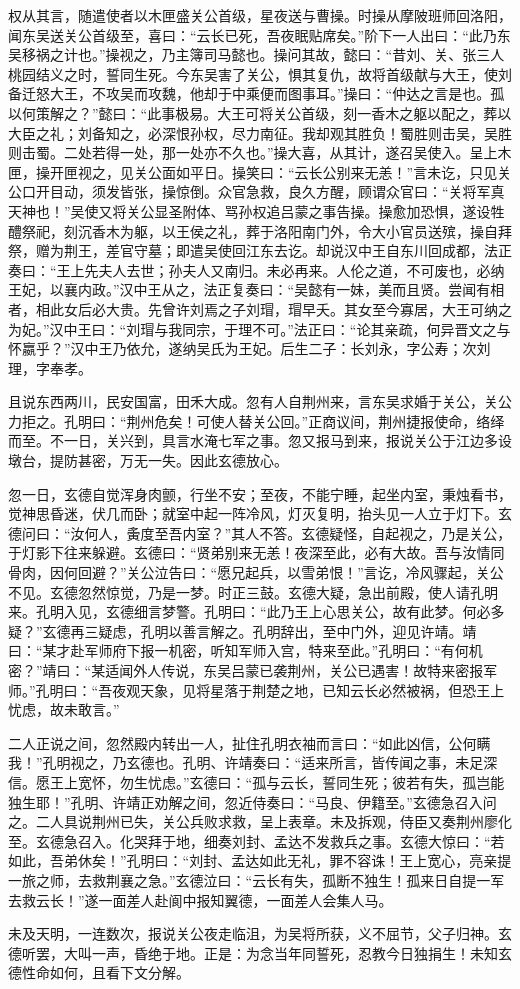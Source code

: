 权从其言，随遣使者以木匣盛关公首级，星夜送与曹操。时操从摩陂班师回洛阳，闻东吴送关公首级至，喜曰：“云长已死，吾夜眠贴席矣。”阶下一人出曰：“此乃东吴移祸之计也。”操视之，乃主簿司马懿也。操问其故，懿曰：“昔刘、关、张三人桃园结义之时，誓同生死。今东吴害了关公，惧其复仇，故将首级献与大王，使刘备迁怒大王，不攻吴而攻魏，他却于中乘便而图事耳。”操曰：“仲达之言是也。孤以何策解之？”懿曰：“此事极易。大王可将关公首级，刻一香木之躯以配之，葬以大臣之礼；刘备知之，必深恨孙权，尽力南征。我却观其胜负！蜀胜则击吴，吴胜则击蜀。二处若得一处，那一处亦不久也。”操大喜，从其计，遂召吴使入。呈上木匣，操开匣视之，见关公面如平日。操笑曰：“云长公别来无恙！”言未讫，只见关公口开目动，须发皆张，操惊倒。众官急救，良久方醒，顾谓众官曰：“关将军真天神也！”吴使又将关公显圣附体、骂孙权追吕蒙之事告操。操愈加恐惧，遂设牲醴祭祀，刻沉香木为躯，以王侯之礼，葬于洛阳南门外，令大小官员送殡，操自拜祭，赠为荆王，差官守墓；即遣吴使回江东去讫。却说汉中王自东川回成都，法正奏曰：“王上先夫人去世；孙夫人又南归。未必再来。人伦之道，不可废也，必纳王妃，以襄内政。”汉中王从之，法正复奏曰：“吴懿有一妹，美而且贤。尝闻有相者，相此女后必大贵。先曾许刘焉之子刘瑁，瑁早夭。其女至今寡居，大王可纳之为妃。”汉中王曰：“刘瑁与我同宗，于理不可。”法正曰：“论其亲疏，何异晋文之与怀嬴乎？”汉中王乃依允，遂纳吴氏为王妃。后生二子：长刘永，字公寿；次刘理，字奉孝。

且说东西两川，民安国富，田禾大成。忽有人自荆州来，言东吴求婚于关公，关公力拒之。孔明曰：“荆州危矣！可使人替关公回。”正商议间，荆州捷报使命，络绎而至。不一日，关兴到，具言水淹七军之事。忽又报马到来，报说关公于江边多设墩台，提防甚密，万无一失。因此玄德放心。

忽一日，玄德自觉浑身肉颤，行坐不安；至夜，不能宁睡，起坐内室，秉烛看书，觉神思昏迷，伏几而卧；就室中起一阵冷风，灯灭复明，抬头见一人立于灯下。玄德问曰：“汝何人，夤度至吾内室？”其人不答。玄德疑怪，自起视之，乃是关公，于灯影下往来躲避。玄德曰：“贤弟别来无恙！夜深至此，必有大故。吾与汝情同骨肉，因何回避？”关公泣告曰：“愿兄起兵，以雪弟恨！”言讫，冷风骤起，关公不见。玄德忽然惊觉，乃是一梦。时正三鼓。玄德大疑，急出前殿，使人请孔明来。孔明入见，玄德细言梦警。孔明曰：“此乃王上心思关公，故有此梦。何必多疑？”玄德再三疑虑，孔明以善言解之。孔明辞出，至中门外，迎见许靖。靖曰：“某才赴军师府下报一机密，听知军师入宫，特来至此。”孔明曰：“有何机密？”靖曰：“某适闻外人传说，东吴吕蒙已袭荆州，关公已遇害！故特来密报军师。”孔明曰：“吾夜观天象，见将星落于荆楚之地，已知云长必然被祸，但恐王上忧虑，故未敢言。”

二人正说之间，忽然殿内转出一人，扯住孔明衣袖而言曰：“如此凶信，公何瞒我！”孔明视之，乃玄德也。孔明、许靖奏曰：“适来所言，皆传闻之事，未足深信。愿王上宽怀，勿生忧虑。”玄德曰：“孤与云长，誓同生死；彼若有失，孤岂能独生耶！”孔明、许靖正劝解之间，忽近侍奏曰：“马良、伊籍至。”玄德急召入问之。二人具说荆州已失，关公兵败求救，呈上表章。未及拆观，侍臣又奏荆州廖化至。玄德急召入。化哭拜于地，细奏刘封、孟达不发救兵之事。玄德大惊曰：“若如此，吾弟休矣！”孔明曰：“刘封、孟达如此无礼，罪不容诛！王上宽心，亮亲提一旅之师，去救荆襄之急。”玄德泣曰：“云长有失，孤断不独生！孤来日自提一军去救云长！”遂一面差人赴阆中报知翼德，一面差人会集人马。

未及天明，一连数次，报说关公夜走临沮，为吴将所获，义不屈节，父子归神。玄德听罢，大叫一声，昏绝于地。正是：为念当年同誓死，忍教今日独捐生！未知玄德性命如何，且看下文分解。